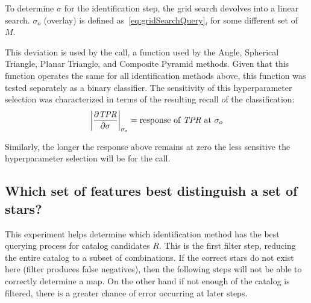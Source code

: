 To determine $\sigma$ for the identification step, the grid search devolves into a linear search.
$\sigma_o$ (overlay) is defined as~\autoref{eq:gridSearchQuery}, for some different set of $M$.

This deviation is used by the  call, a function used by the Angle, Spherical Triangle, Planar Triangle, and
Composite Pyramid methods.
Given that this function operates the same for all identification methods above, this function was tested separately
as a binary classifier.
The sensitivity of this hyperparameter selection was characterized in terms of the resulting recall of the
classification:
\begin{equation}
    \label{eq:sensitivityIdentification}
    \left\lvert\frac{\partial \mathit{TPR}}{\partial \sigma}\right\rvert_{\sigma_o} = \text{response of } \mathit{TPR}
    \text{ at } \sigma_o \\
\end{equation}

Similarly, the longer the response above remains at zero the less sensitive the hyperparameter selection will be for
the  call.

\subsection{Which set of features best distinguish a set of stars?}\label{subsec:querySelectivityMethods}
This experiment helps determine which identification method has the best querying process for catalog candidates $R$.
This is the first filter step, reducing the entire catalog to a subset of combinations.
If the correct stars do not exist here (filter produces false negatives), then the following steps will not be able to
correctly determine a map.
On the other hand if not enough of the catalog is filtered, there is a greater chance of error occurring at later steps.

